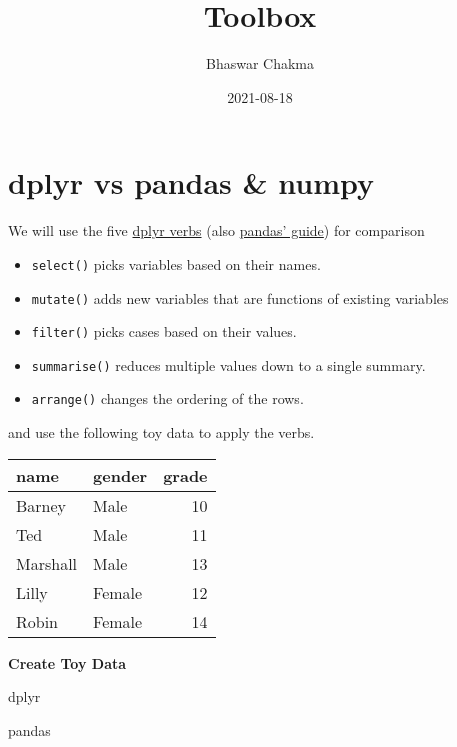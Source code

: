 \documentclass[
]{book}
\title{Toolbox}
\author{Bhaswar Chakma}
\date{2021-08-18}
\begin{document}
\maketitle

{
\setcounter{tocdepth}{1}
\tableofcontents
}
\hypertarget{section}{%
\chapter*{}\label{section}}

\hypertarget{dplyr-vs-pandas-numpy}{%
\chapter{dplyr vs pandas \& numpy}\label{dplyr-vs-pandas-numpy}}

We will use the five \href{https://dplyr.tidyverse.org/}{dplyr verbs} (also \href{https://pandas.pydata.org/pandas-docs/stable/getting_started/comparison/comparison_with_r.html}{pandas' guide}) for comparison

\begin{itemize}
\item
  \texttt{select()} picks variables based on their names.
\item
  \texttt{mutate()} adds new variables that are functions of existing variables
\item
  \texttt{filter()} picks cases based on their values.
\item
  \texttt{summarise()} reduces multiple values down to a single summary.
\item
  \texttt{arrange()} changes the ordering of the rows.
\end{itemize}

and use the following toy data to apply the verbs.

\begin{tabular}{l|l|r}
\hline
name & gender & grade\\
\hline
Barney & Male & 10\\
\hline
Ted & Male & 11\\
\hline
Marshall & Male & 13\\
\hline
Lilly & Female & 12\\
\hline
Robin & Female & 14\\
\hline
\end{tabular}

{\textbf{Create Toy Data}}

dplyr

pandas
\end{document}
